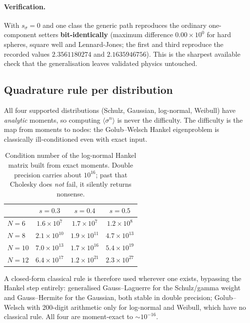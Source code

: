 \documentclass[11pt,a4paper]{article}
\begin{document}
\paragraph{Verification.} With $s_\sigma=0$ and one class the generic path
reproduces the ordinary one-component setters \textbf{bit-identically}
(maximum difference $0.00\times10^{0}$ for hard spheres, square well and
Lennard-Jones; the first and third reproduce the recorded values $2.3561180274$
and $2.1635946756$). This is the sharpest available check that the
generalisation leaves validated physics untouched.

\subsection{Quadrature rule per distribution}
\label{sec:nodes}

All four supported distributions (Schulz, Gaussian, log-normal, Weibull) have
\emph{analytic} moments, so computing $\langle\sigma^n\rangle$ is never the
difficulty. The difficulty is the map from moments to nodes: the Golub--Welsch
Hankel eigenproblem is classically ill-conditioned even with exact input.

\begin{table}[htbp]
\centering
\caption{Condition number of the log-normal Hankel matrix built from exact
moments. Double precision carries about $10^{16}$; past that Cholesky does
\emph{not} fail, it silently returns nonsense.}
\begin{tabular}{lccc}
\toprule
 & $s=0.3$ & $s=0.4$ & $s=0.5$\\
\midrule
$N=6$  & $1.6\times10^{7}$  & $1.7\times10^{7}$  & $1.2\times10^{8}$\\
$N=8$  & $2.1\times10^{10}$ & $1.9\times10^{11}$ & $4.7\times10^{13}$\\
$N=10$ & $7.0\times10^{13}$ & $1.7\times10^{16}$ & $5.4\times10^{19}$\\
$N=12$ & $6.4\times10^{17}$ & $1.2\times10^{21}$ & $2.3\times10^{27}$\\
\bottomrule
\end{tabular}
\end{table}

A closed-form classical rule is therefore used wherever one exists, bypassing
the Hankel step entirely: generalised Gauss--Laguerre for the Schulz/gamma
weight and Gauss--Hermite for the Gaussian, both stable in double precision;
Golub--Welsch with 200-digit arithmetic only for log-normal and Weibull, which
have no classical rule. All four are moment-exact to $\sim10^{-16}$.
\end{document}
